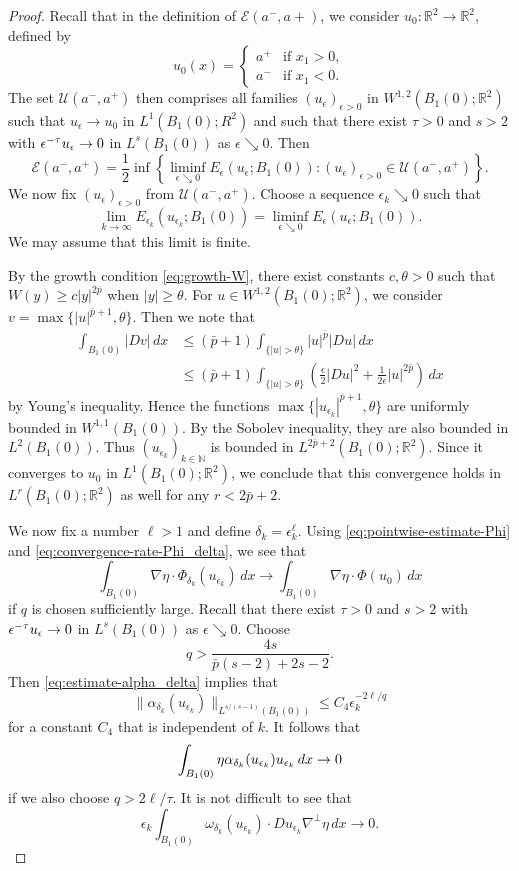 \documentclass[a4paper]{article}
\newcommand{\R}{\mathbb{R}}
\newcommand{\N}{\mathbb{N}}
\let\div\relax\DeclareMathOperator{\div}{div}
\newcommand{\set}[2]{\left\{ #1 \colon #2 \right\}}
\theoremstyle{definition}
\theoremstyle{remark}
\begin{document}
\begin{proof}
Recall that in the definition of $\mathcal{E}(a^-, a+)$, we consider
$u_0 \colon \R^2 \to \R^2$, defined by
\[
u_0(x) = \begin{cases}
a^+ & \text{if $x_1 > 0$}, \\
a^- & \text{if $x_1 < 0$}.
\end{cases}
\]
The set $\mathcal{U}(a^-, a^+)$ then comprises all families
$(u_\epsilon)_{\epsilon > 0}$ in $W^{1, 2}(B_1(0); \R^2)$ such that
$u_\epsilon \to u_0$ in $L^1(B_1(0); R^2)$ and such that there exist $\tau > 0$ and
$s > 2$ with $\epsilon^{-\tau} \div u_\epsilon \to 0$ in
$L^s(B_1(0))$ as $\epsilon \searrow 0$. Then
\[
\mathcal{E}(a^-, a^+) = \frac{1}{2} \inf\set{\liminf_{\epsilon \searrow 0} E_\epsilon(u_\epsilon; B_1(0))}{(u_\epsilon)_{\epsilon > 0} \in \mathcal{U}(a^-, a^+)}.
\]
We now fix $(u_\epsilon)_{\epsilon > 0}$ from $\mathcal{U}(a^-, a^+)$.
Choose a sequence $\epsilon_k \searrow 0$ such that
\[
\lim_{k \to \infty} E_{\epsilon_k}(u_{\epsilon_k}; B_1(0)) = \liminf_{\epsilon \searrow 0} E_\epsilon(u_\epsilon; B_1(0)).
\]
We may assume that this limit is finite.

By the growth condition \eqref{eq:growth-W}, there exist constants $c, \theta > 0$ such that $W(y) \ge c|y|^{2\bar{p}}$
when $|y| \ge \theta$. For $u \in W^{1, 2}(B_1(0); \R^2)$, we consider $v = \max\{|u|^{\bar{p} + 1}, \theta\}$. Then we
note that
\[
\begin{split}
\int_{B_1(0)} |Dv| \, dx & \le (\bar{p} + 1) \int_{\{|u| > \theta\}} |u|^{\bar{p}} |Du| \, dx \\
& \le (\bar{p} + 1) \int_{\{|u| > \theta\}} \left(\frac{\epsilon}{2} |Du|^2 + \frac{1}{2\epsilon} |u|^{2\bar{p}}\right) \, dx
\end{split}
\]
by Young's inequality. Hence
the functions $\max\{|u_{\epsilon_k}|^{\bar{p} + 1}, \theta\}$ are uniformly bounded in
$W^{1, 1}(B_1(0))$. By the Sobolev inequality, they are also bounded in
$L^2(B_1(0))$. Thus $(u_{\epsilon_k})_{k \in \N}$ is bounded in
$L^{2\bar{p} + 2}(B_1(0); \R^2)$. Since it converges to $u_0$ in $L^1(B_1(0); \R^2)$,
we conclude that this convergence holds in $L^r(B_1(0); \R^2)$ as well for any $r < 2\bar{p} + 2$.

We now fix a number $\ell > 1$ and define $\delta_k = \epsilon_k^\ell$. Using \eqref{eq:pointwise-estimate-Phi}
and \eqref{eq:convergence-rate-Phi_delta}, we see that
\[
\int_{B_1(0)} \nabla \eta \cdot \Phi_{\delta_k}(u_{\epsilon_k}) \, dx \to \int_{B_1(0)} \nabla \eta \cdot \Phi(u_0) \, dx
\]
if $q$ is chosen sufficiently large. Recall that there exist $\tau > 0$ and
$s > 2$ with $\epsilon^{-\tau} \div u_\epsilon \to 0$ in
$L^s(B_1(0))$ as $\epsilon \searrow 0$. Choose
\[
q > \frac{4s}{\bar{p}(s - 2) + 2s - 2}.
\]
Then \eqref{eq:estimate-alpha_delta} implies that
\[
\|\alpha_{\delta_k}(u_{\epsilon_k})\|_{L^{s/(s - 1)}(B_1(0))} \le C_4 \epsilon_k^{-2\ell/q}
\]
for a constant $C_4$ that is independent of $k$. It follows that
\[
\int_{B_1(0)} \eta \alpha_{\delta_k}(u_{\epsilon_k}) \div u_{\epsilon_k} \, dx \to 0
\]
if we also choose $q > 2\ell/\tau$. It is not difficult to see that
\[
\epsilon_k \int_{B_1(0)} \omega_{\delta_k}(u_{\epsilon_k}) \cdot Du_{\epsilon_k} \nabla^\perp \eta \, dx \to 0.
\]


\end{proof}
\end{document}
